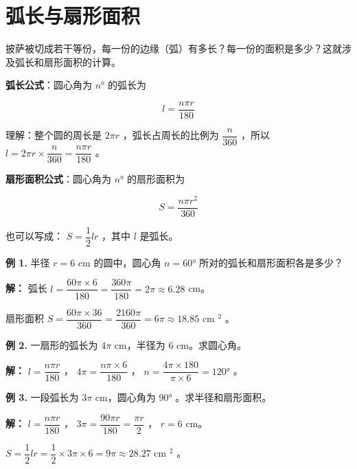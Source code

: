 \section*{弧长与扇形面积}


\begin{explore}


披萨被切成若干等份，每一份的边缘（弧）有多长？每一份的面积是多少？这就涉及弧长和扇形面积的计算。

\end{explore}

\begin{understand}


\textbf{弧长公式}：圆心角为 $n°$ 的弧长为

\[
l = \frac{n\pi r}{180}
\]


理解：整个圆的周长是 $2\pi r$ ，弧长占周长的比例为 $\dfrac{n}{360}$ ，所以 $l = 2\pi r \times \dfrac{n}{360} = \dfrac{n\pi r}{180}$ 。

\textbf{扇形面积公式}：圆心角为 $n°$ 的扇形面积为

\[
S = \frac{n\pi r^2}{360}
\]


也可以写成： $S = \dfrac{1}{2}lr$ ，其中 $l$ 是弧长。

\end{understand}

\begin{workedexamples}


\textbf{例 1.} 半径 $r = 6$ cm 的圆中，圆心角 $n = 60°$ 所对的弧长和扇形面积各是多少？

\textbf{解：}
弧长 $l = \dfrac{60\pi \times 6}{180} = \dfrac{360\pi}{180} = 2\pi \approx 6.28$ cm。

扇形面积 $S = \dfrac{60\pi \times 36}{360} = \dfrac{2160\pi}{360} = 6\pi \approx 18.85$ cm $^2$ 。

\textbf{例 2.} 一扇形的弧长为 $4\pi$ cm，半径为 $6$ cm。求圆心角。

\textbf{解：}
$l = \dfrac{n\pi r}{180}$ ， $4\pi = \dfrac{n\pi \times 6}{180}$ ， $n = \dfrac{4\pi \times 180}{\pi \times 6} = 120°$ 。

\textbf{例 3.} 一段弧长为 $3\pi$ cm，圆心角为 $90°$ 。求半径和扇形面积。

\textbf{解：}
$l = \dfrac{n\pi r}{180}$ ， $3\pi = \dfrac{90\pi r}{180} = \dfrac{\pi r}{2}$ ， $r = 6$ cm。

$S = \dfrac{1}{2}lr = \dfrac{1}{2} \times 3\pi \times 6 = 9\pi \approx 28.27$ cm $^2$ 。

\end{workedexamples}

